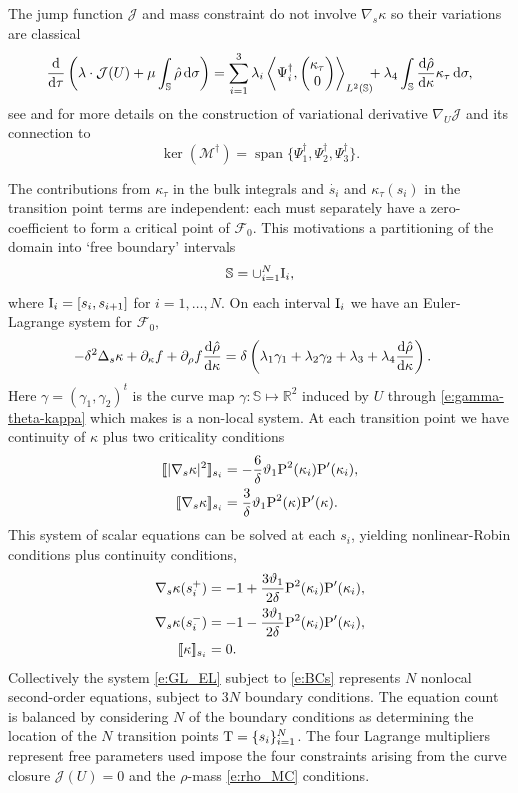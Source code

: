\documentclass[11pt]{amsart}
\theoremstyle{plain}
\newcommand{\beq}{\begin{equation}}
\newcommand{\eeq}{\end{equation}}
\newcommand{\jmp}[1]{[\![#1]\!]}
\def\cF{{\mathcal F}}
\def\cJ{{\mathcal J}}
\def\cM{{\mathcal M}}
\def\mbbR{\mathbb{R}}
\def\mbbS{\mathbb{S}}
\def\mrI{\textrm I}
\def\mrP{\textrm P}
\def\mrT{\textrm T}
\def\mrd{\textrm d}
\def\cF{{\mathcal F}}
\def\bpm{\begin{pmatrix}}
\def\epm{\end{pmatrix}}
\DeclareMathOperator{\Span}{span}
\def\rmd{\mathrm d}
\numberwithin{equation}{section}
\theoremstyle{plain}
\begin{document}
The jump function $\cJ$ and mass constraint do not involve  $\nabla_s\kappa$ so their variations are classical
$$  \frac{\mrd}{\mrd \tau}\left(\lambda \cdot\cJ(U)+\mu \int_\mbbS \hat\rho\,\mrd\sigma\right)=\sum_{i=1}^3\lambda_i\left\langle\Psi^\dag_i,\bpm \kappa_\tau\cr 0 \epm \right\rangle_{L^2(\mbbS)}\!\!\!+\lambda_4 \int_\mbbS \frac{\mrd\hat\rho}{\mrd\kappa}\kappa_\tau\,\mrd\sigma,$$
see \cite{NPW_25} and \cite{Pwu_26} for more details on the construction of variational derivative $\nabla_U\cJ$ and its connection to 
$$\ker(\cM^\dag)=\Span\{\Psi_1^\dag, \Psi_2^\dag, \Psi_3^\dag\}.$$

The contributions from $\kappa_\tau$  in the bulk integrals and $\dot{s_i}$ and $\kappa_\tau(s_i)$ in the transition point terms are independent: each must separately have a zero-coefficient to form a critical point of $\cF_0$. 
This motivations a partitioning of the domain into `free boundary' intervals 
$$\mbbS=\cup _{i=1}^N \mrI_i, $$
where $\mrI_i=[s_i, s_{i+1}]$ for $i=1,\ldots, N$. On each interval $\mrI_i$ we have an Euler-Lagrange system for $\cF_0,$
\beq\label{e:GL_EL}
\begin{aligned}
 -\delta^2 \Delta_s\kappa +\partial_\kappa f +\partial_\rho f\frac{\mrd\hat \rho}{\rmd\kappa}&=
 \delta\left(\lambda_1\gamma_1+\lambda_2\gamma_2+\lambda_3+\lambda_4 \frac{\mrd \hat\rho}{\mrd \kappa}\right).
\end{aligned}
\eeq
Here $\gamma=(\gamma_1,\gamma_2)^t$ is the curve map $\gamma:\mbbS\mapsto\mbbR^2$ induced by $U$ through \eqref{e:gamma-theta-kappa} which makes is a non-local system. At each transition point we have continuity of $\kappa$ plus two criticality conditions
\beq\begin{aligned}
\jmp{|\nabla_s \kappa|^2}_{s_i} &=-\frac{6}{\delta}\vartheta_1\mrP^2(\kappa_i)\mrP'(\kappa_i),\\
\jmp{\nabla_s\kappa}_{s_i}&=\frac{3}{\delta}\vartheta_1\mrP^2(\kappa)
\mrP'(\kappa).
\end{aligned}
\eeq
This system of scalar equations can be solved at each $s_i$, yielding nonlinear-Robin conditions
plus continuity conditions,
\beq\label{e:BCs}
\begin{aligned}
\nabla_s\kappa(s_i^+)&=-1+\frac{3\vartheta_1}{2\delta} \mrP^2(\kappa_i)\mrP'(\kappa_i),\\
\nabla_s\kappa(s_i^-)&=-1-\frac{3\vartheta_1}{2\delta} \mrP^2(\kappa_i)\mrP'(\kappa_i), \\
\jmp{\kappa}_{s_i}&=0.
\end{aligned}
\eeq
Collectively the system \eqref{e:GL_EL} subject to \eqref{e:BCs} represents  $N$ nonlocal second-order equations, subject to $3N$ boundary conditions. The equation count is balanced by considering $N$ of the boundary conditions as determining the location of the $N$ transition points $\mrT=\{s_i\}_{i=1}^N$.  The four Lagrange multipliers represent free parameters used impose the four constraints arising from the curve closure $\cJ(U)=0$ and the $\rho$-mass  \eqref{e:rho_MC} conditions.
\end{document}
